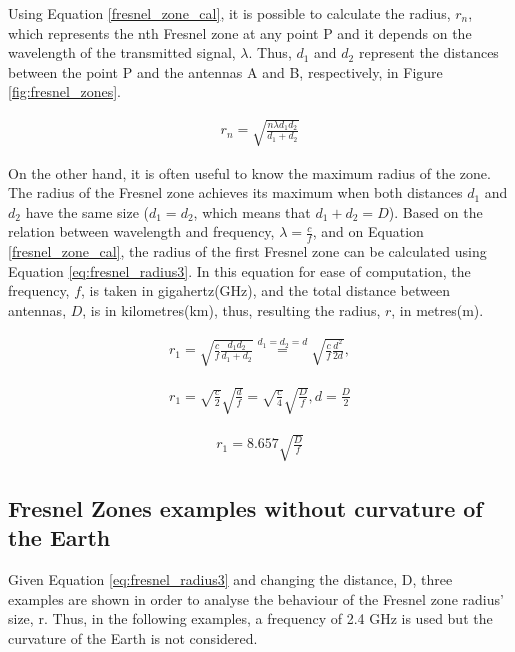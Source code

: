 Using Equation \ref{fresnel_zone_cal}, it is possible to calculate the radius, $r_n$, which represents the nth Fresnel zone at any point P and it depends on the wavelength of the transmitted signal, $\lambda$. Thus, $d_1$ and $d_2$ represent the distances between the point P and the antennas A and B, respectively, in Figure \ref{fig:fresnel_zones}.

\begin{align}
r_n = \sqrt{\frac{n \lambda d_1 d_2}{d_1+d_2}} \label{fresnel_zone_cal}
\end{align}

On the other hand, it is often useful to know the maximum radius of the zone. The radius of the Fresnel zone achieves its maximum when both distances $d_1$ and $d_2$ have the same size ($d_1=d_2$, which means that $d_1+d_2=D$). Based on the relation between wavelength and frequency, $\lambda = \frac{c}{f}$, and on Equation \ref{fresnel_zone_cal}, the radius of the first Fresnel zone can be calculated using Equation \ref{eq:fresnel_radius3}. In this equation for ease of computation, the frequency, $f$, is taken in gigahertz(GHz), and the total distance between antennas, $D$, is in kilometres(km), thus, resulting the radius, $r$, in metres(m). 

\begin{align}
r_1 = \sqrt{\frac{c}{f}\frac{d_1 d_2}{d_1+d_2}} \stackrel{d_1=d_2=d}{=} \sqrt{\frac{c}{f}\frac{d^2}{2d}},  \label{eq:fresnel_radius1}
\end{align}

\begin{align}
r_1 = \sqrt{\frac{c}{2}}\sqrt{\frac{d}{f}} = \sqrt{\frac{c}{4}}\sqrt{\frac{D}{f}}, d=\frac{D}{2} \label{eq:fresnel_radius2}
\end{align}

\begin{align}
r_1 = 8.657 \sqrt{\frac{D}{f}} \label{eq:fresnel_radius3}
\end{align}

\subsection{Fresnel Zones examples without curvature of the Earth}
Given Equation \ref{eq:fresnel_radius3} and changing the distance, D, three examples are shown in order to analyse the behaviour of the Fresnel zone radius' size, r. Thus, in the following examples, a frequency of 2.4 GHz is used but the curvature of the Earth is not considered. 

